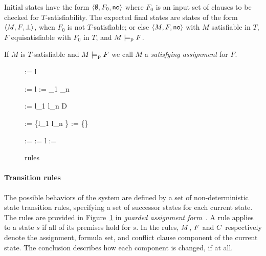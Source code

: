 \documentclass{svjour3}                     %
\begin{document}
Initial states have the form 
$\langle \emptyset, F_0, \mathsf{no} \rangle$ where $F_0$ is an input set of clauses
to be checked for $T$-satisfiability.
The expected final states are states of the form $\langle M, F, \bot \rangle$, 
when $F_0$ is not $T$-satisfiable;
or else $\langle M, F, \mathsf{no} \rangle$ with 
$M$ satisfiable in $T$,
$F$ equisatisfiable with $F_0$ in $T$, and
$M \models_{\mathrm{p}} F$.

If $M$ is $T$-satisfiable and $M \models_{\mathrm{p}} F$ 
we call $M$ a \emph{satisfying assignment} for $F$.


\begin{figure}[t]
{\Mc := \Mc\;l}
\medskip

\decide
{}
{\Mc := \Mc \bullet l}
\qquad
{}%
{\Cc := _1 \lor \cdots \lor {}_n}
\medskip

{\Cc := l_1 \lor \cdots \lor l_n \lor D}
\medskip

{}
{\Fc := \Fc \cup \{l_1 \lor \cdots \lor l_n \}}
\qquad
{}
\drule{
\Cc \neq \none \quad
\bullet \in \Mc
}
{\Fc := \Fc \cup \{\Cc\}}
\medskip

\backjump
{}
{\Cc := \none
\quad
\Mc := \: l
}
\qquad
\fail
\drule{ 
\Cc \neq \none \quad
\bullet \notin \Mc
}
{\Cc := \bot}

\caption{\dpllts rules}
\label{fig:rules}
\end{figure}


\paragraph{Transition rules}
The possible behaviors of the system are defined 
by a set of non-deterministic state transition rules,
specifying a set of successor states for each current state.
The rules are provided in Figure~\ref{fig:rules}
in \emph{guarded assignment form}~\cite{KrsGoe-FROCOS-07}.
A rule applies to a state $s$ if all of its premises hold for $s$.
In the rules,
$M$, $F$ and $C$ respectively denote 
the assignment, formula set, and conflict clause component of the current state.
The %
conclusion describes how each component is changed, if at all.
\end{document}

